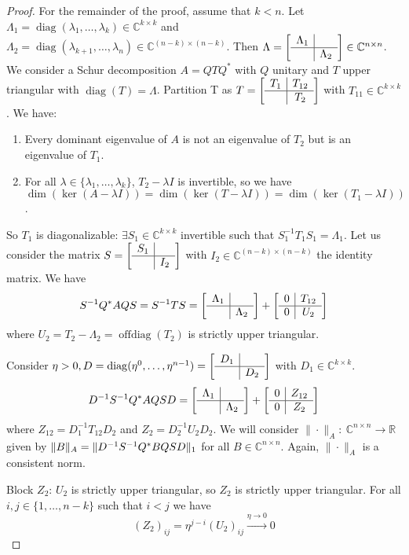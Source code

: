 \documentclass[12pt]{article}
\theoremstyle{definition}
\theoremstyle{remark}
\numberwithin{equation}{section}
\newcommand{\R}{\mathbb{R}}
\newcommand{\C}{\mathbb{C}}
\newcommand{\normempty}{\|\cdot\|}
\newcommand{\blockFull}[4]{
  \left[
    \begin{array}{c|c}
      #1 & #2\\\hline
      #3 & #4\\
    \end{array}
  \right]
}
\DeclarePairedDelimiter{\norm}{\lVert}{\rVert}
\DeclareMathOperator{\diag}{diag}
\DeclareMathOperator{\offdiag}{offdiag}
\begin{document}
\begin{proof}
  For the remainder of the proof, assume that $k<n$. Let $\Lambda_1 = \diag(\lambda_1,\ldots,\lambda_k) \in \C^{k\times k}$ and $\Lambda_2 = \diag(\lambda_{k+1},\ldots,\lambda_n) \in \C^{(n-k)\times(n-k)}$. Then $\Lambda = \blockFull{\Lambda_1}{}{}{\Lambda_2} \in \C^{n\times n}$. We consider a Schur decomposition $A = QTQ^*$ with $Q$ unitary and $T$ upper triangular with $\diag(T) = \Lambda$. Partition T as $T = \blockFull{T_{1}}{T_{12}}{}{T_{2}}$ with $T_{11} \in \C^{k\times k}$. We have:

  \begin{enumerate}[label=(\roman*)]
    \item Every dominant eigenvalue of $A$ is not an eigenvalue of $T_2$ but is an eigenvalue of $T_1$.
    \item For all $\lambda \in \{\lambda_1,\ldots,\lambda_k\}$, $T_2 - \lambda I$ is invertible, so we have $\dim(\ker(A - \lambda I)) = \dim(\ker(T - \lambda I)) = \dim(\ker(T_1 - \lambda I))$.
  \end{enumerate}

  So $T_1$ is diagonalizable: $\exists S_1 \in \C^{k\times k}$ invertible such that $S_1^{-1} T_1 S_1 = \Lambda_1$. Let us consider the matrix $S = \blockFull{S_1}{}{}{I_2}$ with $I_2 \in \C^{(n-k)\times(n-k)}$ the identity matrix. We have
  \begin{equation*}
    S^{-1}Q^*AQS = S^{-1}TS = \blockFull{\Lambda_1}{}{}{\Lambda_2} + \blockFull{0}{T_{12}}{0}{U_2}
  \end{equation*}
  where $U_2 = T_2 - \Lambda_2 = \offdiag(T_2)$ is strictly upper triangular.

  Consider $\eta > 0, D=\diag(\eta^0,\ldots,\eta^{n-1}) = \blockFull{D_1}{}{}{D_2}$ with $D_1 \in \C^{k\times k}$.
  \begin{equation*}
    D^{-1}S^{-1}Q^*AQSD = \blockFull{\Lambda_1}{}{}{\Lambda_2} + \blockFull{0}{Z_{12}}{0}{Z_2}
  \end{equation*}
  where $Z_{12} = D_1^{-1}T_{12}D_2$ and $Z_2 = D_2^{-1}U_2D_2$. We will consider $\normempty_A:\ \C^{n\times n} \rightarrow \R$ given by $\norm{B}_A = \norm{D^{-1}S^{-1}Q^*BQSD}_1$ for all $B \in \C^{n \times n}$. Again, $\normempty_A$ is a consistent norm.

  Block $Z_2$: $U_2$ is strictly upper triangular, so $Z_2$ is strictly upper triangular. For all $i,j \in \{1,\ldots,n-k\}$ such that $i < j$ we have
  \begin{equation*}
    (Z_2)_{ij} = \eta^{j-i}(U_2)_{ij} \xrightarrow{\eta \rightarrow 0} 0
  \end{equation*}


\end{proof}
\end{document}
